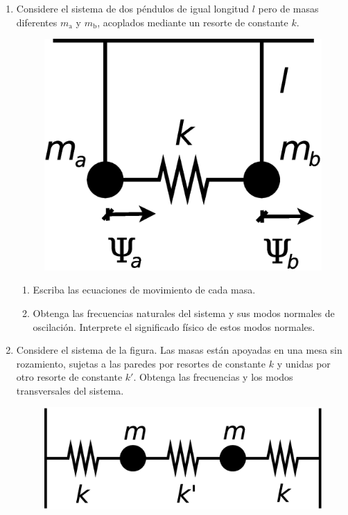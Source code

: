 \documentclass[11pt,spanish]{article}
\begin{document}
\begin{enumerate}

    \item Considere el sistema de dos péndulos de igual longitud $l$ pero de
    masas diferentes $m_\text{a}$ y $m_\text{b}$, acoplados mediante un resorte
    de constante $k$. 

    \begin{figure}[H]
        \centering{}\includegraphics[clip,scale=0.3]{figs/ej1-7}
    \end{figure}

    \begin{enumerate}
        \item Escriba las ecuaciones de movimiento de cada masa.

        \item Obtenga las frecuencias naturales del sistema y sus modos normales
        de oscilación. Interprete el significado físico de estos modos normales.

    \end{enumerate}


    \item Considere el sistema de la figura. Las masas están apoyadas en una 
    mesa sin rozamiento, sujetas a las paredes por resortes de constante $k$ y
    unidas por otro resorte de constante $k'$. Obtenga las frecuencias y los
    modos transversales del sistema. 

    \begin{figure}[H]
        \centering{}\includegraphics[clip,scale=0.25]{figs/ej1-8}
    \end{figure}


\end{enumerate}
\end{document}
